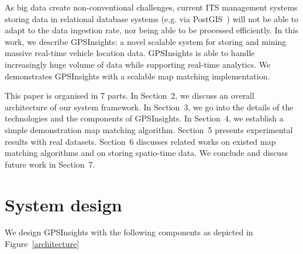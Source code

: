\documentclass{acm_proc_article-sp}
\begin{document}
As big data create non-conventional challenges, current ITS management systems storing data in relational database systems (e.g. via PostGIS~\cite{posgis}) will not be able to adapt to the data ingestion rate, nor being able to be processed efficiently. In this work, we describe GPSInsights: a novel scalable system for storing and mining massive real-time vehicle location data. GPSInsights is able to handle increasingly huge volume of data while supporting real-time analytics. We demonstrates GPSInsights with a scalable map matching implementation. 

This paper is organised in 7 parts. In Section~2, we discuss an overall architecture of our system framework. In Section~3, we go into the details of the technologies and the components of GPSInsights. In Section~4, we establish a simple demonstration map matching algorithm. Section~5 presents experimental results with real datasets. Section~6 discusses related works on existed map matching algorithms and on storing spatio-time data. We conclude and discuss future work in Section~7.
	
\section{System design} 

We design GPSInsights with the following components as depicted  in Figure~\ref{architecture}
\end{document}
